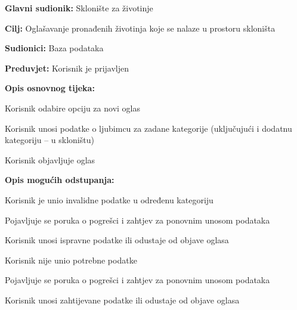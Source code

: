 					\noindent {}
					\begin{packed_item}
						
						\item \textbf{Glavni sudionik: }Sklonište za životinje
						\item  \textbf{Cilj:} Oglašavanje pronađenih životinja koje se nalaze u prostoru skloništa
						\item  \textbf{Sudionici:} Baza podataka
						\item  \textbf{Preduvjet:} Korisnik je prijavljen
						\item  \textbf{Opis osnovnog tijeka:}
						
						\item[] \begin{packed_enum}
							
							\item Korisnik odabire opciju za novi oglas
							\item Korisnik unosi podatke o ljubimcu za zadane kategorije (uključujući i dodatnu kategoriju – u skloništu)
							\item Korisnik objavljuje oglas
						\end{packed_enum}
						
						\item  \textbf{Opis mogućih odstupanja:}
						
						\item[] \begin{packed_item}
							
							\item[2.a] Korisnik je unio invalidne podatke u određenu kategoriju
							\item[] \begin{packed_enum}
								
								\item Pojavljuje se poruka o pogrešci i zahtjev za ponovnim unosom podataka
								\item Korisnik unosi ispravne podatke ili odustaje od objave oglasa
								
							\end{packed_enum}
							\item[2.b] Korisnik nije unio potrebne podatke
							\item[] \begin{packed_enum}
								
								\item Pojavljuje se poruka o pogrešci i zahtjev za ponovnim unosom podataka
								\item Korisnik unosi zahtijevane podatke ili odustaje od objave oglasa
								
							\end{packed_enum}
						\end{packed_item}
					\end{packed_item}
					
